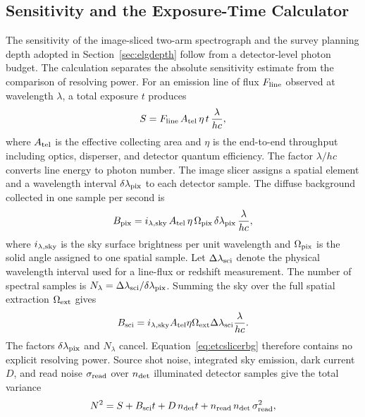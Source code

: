 \subsection{Sensitivity and the Exposure-Time Calculator}\label{sec:etc}

The sensitivity of the image-sliced two-arm spectrograph and the survey planning depth adopted in Section~\ref{sec:elgdepth} follow from a detector-level photon budget. The calculation separates the absolute sensitivity estimate from the comparison of resolving power. For an emission line of flux $F_{\rm line}$ observed at wavelength $\lambda$, a total exposure $t$ produces
\begin{equation}
  S=F_{\rm line}\,A_{\rm tel}\,\eta\,t\,\frac{\lambda}{hc},
  \label{eq:etcsig}
\end{equation}
where $A_{\rm tel}$ is the effective collecting area and $\eta$ is the end-to-end throughput including optics, disperser, and detector quantum efficiency. The factor $\lambda/hc$ converts line energy to photon number. The image slicer assigns a spatial element and a wavelength interval $\delta\lambda_{\rm pix}$ to each detector sample. The diffuse background collected in one sample per second is
\begin{equation}
  B_{\rm pix}=i_{\lambda,{\rm sky}}\,A_{\rm tel}\,\eta\,\Omega_{\rm pix}\,\delta\lambda_{\rm pix}\,\frac{\lambda}{hc},
  \label{eq:etcbg}
\end{equation}
where $i_{\lambda,{\rm sky}}$ is the sky surface brightness per unit wavelength and $\Omega_{\rm pix}$ is the solid angle assigned to one spatial sample. Let $\Delta\lambda_{\rm sci}$ denote the physical wavelength interval used for a line-flux or redshift measurement. The number of spectral samples is $N_\lambda=\Delta\lambda_{\rm sci}/\delta\lambda_{\rm pix}$. Summing the sky over the full spatial extraction $\Omega_{\rm ext}$ gives
\begin{equation}
 B_{\rm sci}=i_{\lambda,{\rm sky}}A_{\rm tel}\eta\Omega_{\rm ext}
 \Delta\lambda_{\rm sci}\frac{\lambda}{hc}.
 \label{eq:etcslicerbg}
\end{equation}
The factors $\delta\lambda_{\rm pix}$ and $N_\lambda$ cancel. Equation~\eqref{eq:etcslicerbg} therefore contains no explicit resolving power. Source shot noise, integrated sky emission, dark current $D$, and read noise $\sigma_{\rm read}$ over $n_{\rm det}$ illuminated detector samples give the total variance
\begin{equation}
  N^2=S+B_{\rm sci}t+D\,n_{\rm det}t+n_{\rm read}\,n_{\rm det}\,\sigma_{\rm read}^2,
  \label{eq:etcnoise}
\end{equation}
